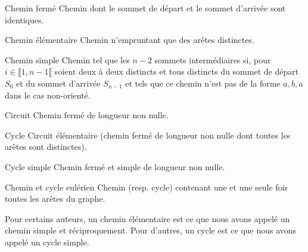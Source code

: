 \begin{defi}{Chemin fermé}
Chemin dont le sommet de départ et le sommet d'arrivée sont identiques.
\end{defi}

\begin{defi}{Chemin élémentaire}
Chemin n'empruntant que des arêtes distinctes.
\end{defi}

\begin{defi}{Chemin simple}
Chemin tel que les $n - 2$ sommets intermédiaires si, pour $i \in \llbracket 1, n-1\llbracket$ soient
deux à deux distincts et tous distincts du sommet de départ $S_0$ et du sommet d’arrivée $S_{n-1}$ et tels
que ce chemin n’est pas de la forme $a, b, a$ dans le cas non-orienté.
\end{defi}

\begin{defi}{Circuit}
Chemin fermé de longueur non nulle.
\end{defi}


\begin{defi}{Cycle}
Circuit élémentaire (chemin fermé de longueur non nulle dont toutes les arêtes sont distinctes).
\end{defi}

\begin{defi}{Cycle simple} 
Chemin fermé et simple de longueur non nulle.
\end{defi}

\begin{defi}{Chemin et cycle eulérien}
Chemin (resp. cycle) contenant une et une seule fois toutes les arêtes du graphe.
\end{defi}

\begin{rem}
Pour certains auteurs, un chemin élémentaire est ce que nous avons appelé un chemin simple et réciproquement. Pour d’autres, un cycle est ce que nous avons appelé un cycle simple.
\end{rem}


